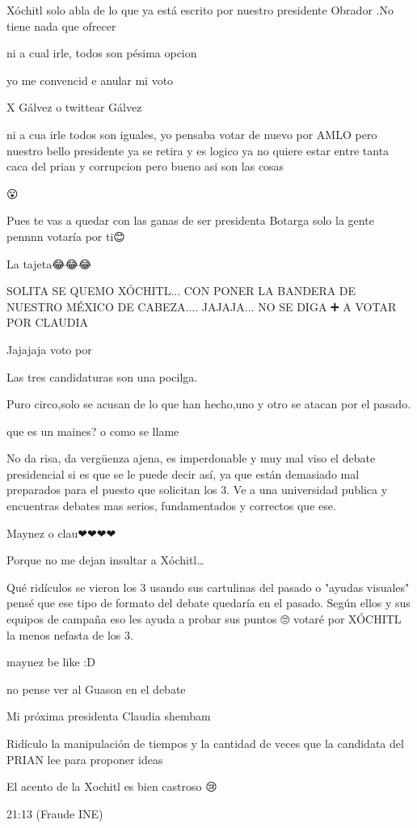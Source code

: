 Xóchitl solo abla de lo que ya está escrito por nuestro presidente Obrador .No tiene nada que ofrecer

ni a cual irle, todos son pésima opcion

yo me convencid e anular mi voto

X Gálvez o twittear Gálvez 🤣🤣🤣🤣

ni a cua irle todos son iguales, yo pensaba votar de nuevo por AMLO pero nuestro bello presidente ya se retira y es logico ya no quiere estar entre tanta caca del prian y corrupcion pero bueno asi son las cosas

😮

Pues te vas a quedar con las ganas de ser presidenta Botarga solo la gente pennnn votaría por ti😊

La tajeta😂😂😂

SOLITA SE QUEMO XÓCHITL... CON PONER LA BANDERA DE NUESTRO MÉXICO DE CABEZA.... JAJAJA... NO SE DIGA ➕ A VOTAR POR CLAUDIA

Jajajaja voto por

Las tres candidaturas son una pocilga.

Puro circo,solo se acusan de lo que han hecho,uno y otro se atacan por el pasado.

que es un maines? o como se llame

No da risa, da vergüenza ajena, es imperdonable y muy mal viso el debate presidencial si es que se le puede decir así, ya que están demasiado mal preparados para el puesto que solicitan los 3. Ve a una universidad publica y encuentras debates mas serios, fundamentados y correctos que ese.

Maynez o clau❤❤❤❤

Porque no me dejan insultar a Xóchitl…

Qué ridículos se vieron los 3 usando sus cartulinas del pasado o "ayudas visuales" pensé que ese tipo de formato del debate quedaría en el pasado. Según ellos y sus equipos de campaña eso les ayuda a probar sus puntos 🙄 votaré por XÓCHITL la menos nefasta de los 3.

maynez be like :D

no pense ver al Guason en el debate

Mi próxima presidenta Claudia shembam 👏👏

Ridículo la manipulación de tiempos y la cantidad de veces que la candidata del PRIAN lee para proponer ideas

El acento de la Xochitl es bien castroso 😢

21:13 (Fraude INE)

